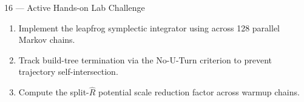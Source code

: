\documentclass[aspectratio=169,10pt]{beamer}
\begin{document}
\begin{frame}{16 — Active Hands-on Lab Challenge}
  \begin{tcolorbox}[enhanced,arc=1.2mm,boxrule=.4pt,colback=BayesPale!50!white,colframe=BayesBorder,borderline west={2.2pt}{0pt}{BayesTeal},title={Lab 04: Vectorized NUTS Sampler in JAX},coltitle=BayesDeepTeal,fonttitle=\bfseries]
    \begin{enumerate}\setlength{\itemsep}{.08cm}\small
      \item Implement the leapfrog symplectic integrator using  across 128 parallel Markov chains.
      \item Track build-tree termination via the No-U-Turn criterion to prevent trajectory self-intersection.
      \item Compute the split-$\hat{R}$ potential scale reduction factor across warmup chains.
    \end{enumerate}
  \end{tcolorbox}
  \vfill
  \begin{columns}[c,onlytextwidth]
    \begin{column}{.53\textwidth}
    \end{column}
    \hfill
    \begin{column}{.45\textwidth}
      \raggedleft{}
    \end{column}
  \end{columns}
\end{frame}
\end{document}
